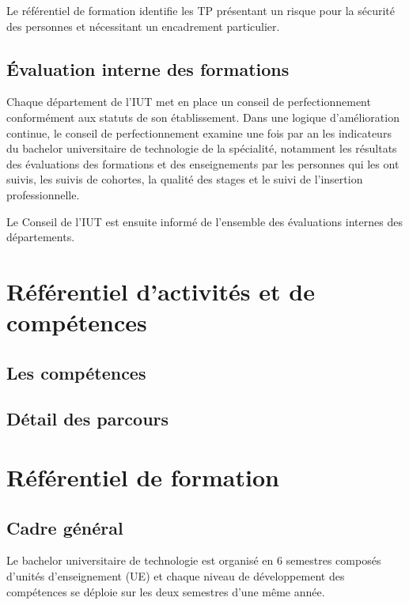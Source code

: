 \documentclass[10pt]{article}
\begin{document}
Le référentiel de formation identifie les TP présentant un risque pour la sécurité des personnes et
nécessitant un encadrement particulier.

\subsection{Évaluation interne des formations}
Chaque département de l’IUT met en place un conseil de perfectionnement
conformément aux statuts de son établissement. Dans une logique
d’amélioration continue, le conseil de perfectionnement examine une fois
par an les indicateurs du bachelor universitaire de technologie de la
spécialité, notamment les résultats des évaluations des formations et
des enseignements par les personnes qui les ont suivis, les suivis de
cohortes, la qualité des stages et le suivi de l’insertion
professionnelle.

Le Conseil de l’IUT est ensuite informé de l’ensemble des évaluations
internes des départements.

\newpage
\section{Référentiel d'activités et de compétences}

\subsection{Les compétences}


\newpage
\subsection{Détail des parcours}


\selectallparcours
\newpage
\section{Référentiel de formation}
\subsection{Cadre général}
Le bachelor universitaire de technologie est organisé en 6 semestres
composés d’unités d’enseignement (UE) et chaque niveau de développement
des compétences se déploie sur les deux semestres d’une même année.
\end{document}
